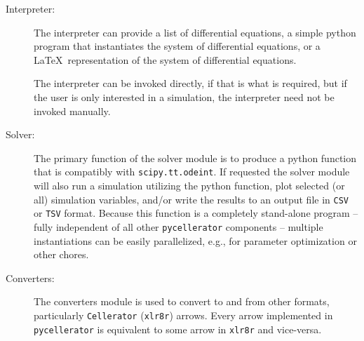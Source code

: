 \begin{description}
\item [Interpreter:]

The interpreter can provide a list of differential equations, a simple python program that instantiates the system of differential equations, or a \LaTeX\ representation of the system of differential equations.

The interpreter can be invoked directly, if that is what is required, but if the user is only interested in a simulation, the interpreter need not be invoked manually. 

\item [Solver:]

The primary function of the solver module is to produce a python function that is compatibly with {\tt scipy.tt.odeint}. If requested the solver module will also run a simulation utilizing the python function, plot selected (or all) simulation variables, and/or write the results to an output file in {\tt CSV} or {\tt TSV} format. Because this function is a completely stand-alone program -- fully independent of all other {\tt pycellerator} components -- multiple instantiations can be easily parallelized, e.g., for parameter optimization or other chores. 

\item [Converters:] The converters module is used to convert to and from other formats, particularly {\tt Cellerator} ({\tt xlr8r}) arrows. Every arrow implemented in {\tt pycellerator} is equivalent to some arrow in {\tt xlr8r} and vice-versa. 





\end{description}






